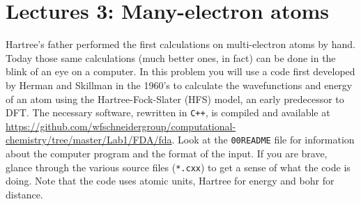 \documentclass[11pt]{article}
\begin{document}
\section{Lectures 3: Many-electron atoms}
\label{sec:org81df1b0}
Hartree’s father performed the first calculations on multi-electron atoms by
hand. Today those same calculations (much better ones, in fact) can be done in
the blink of an eye on a computer. In this problem you will use a code first
developed by Herman and Skillman in the 1960’s to calculate the wavefunctions
and energy of an atom using the Hartree-Fock-Slater (HFS) model, an early
predecessor to DFT. The necessary software, rewritten in \texttt{C++}, is compiled and
available at
\url{https://github.com/wfschneidergroup/computational-chemistry/tree/master/Lab1/FDA/fda}. Look
at the \texttt{00README} file for information about the computer program and the
format of the input. If you are brave, glance through the various source files
(\texttt{*.cxx}) to get a sense of what the code is doing. Note that the code uses
atomic units, Hartree for energy and bohr for distance.
\end{document}
